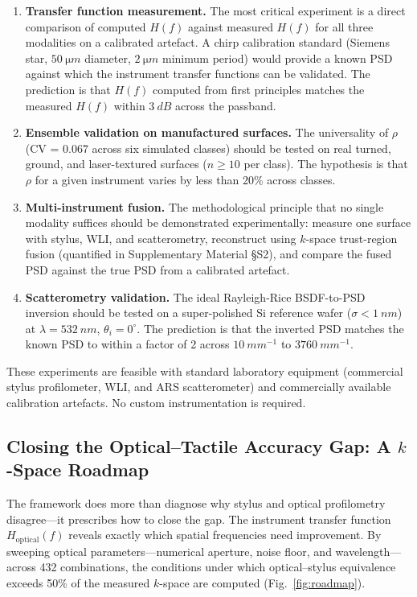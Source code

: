 \documentclass[review,12pt]{elsarticle}
\begin{document}
\begin{enumerate}
    \item \textbf{Transfer function measurement.} The most critical experiment is a direct comparison of computed $H(f)$ against measured $H(f)$ for all three modalities on a calibrated artefact. A chirp calibration standard (Siemens star, $\SI{50}{\micro m}$ diameter, $\SI{2}{\micro m}$ minimum period) would provide a known PSD against which the instrument transfer functions can be validated. The prediction is that $ H(f)$ computed from first principles matches the measured $ H(f)$ within $\SI{3}{dB}$ across the passband.
    
    \item \textbf{Ensemble validation on manufactured surfaces.} The universality of $\rho$ (CV = 0.067 across six simulated classes) should be tested on real turned, ground, and laser-textured surfaces ($n \geq 10$ per class). The hypothesis is that $\rho$ for a given instrument varies by less than 20\% across classes.
    
    \item \textbf{Multi-instrument fusion.} The methodological principle that no single modality suffices should be demonstrated experimentally: measure one surface with stylus, WLI, and scatterometry, reconstruct using $ k$-space trust-region fusion (quantified in Supplementary Material \S S2), and compare the fused PSD against the true PSD from a calibrated artefact.
    
    \item \textbf{Scatterometry validation.} The ideal Rayleigh-Rice BSDF-to-PSD inversion should be tested on a super-polished Si reference wafer ($\sigma < \SI{1}{nm}$) at $\lambda = \SI{532}{nm}$, $\theta_i = 0^\circ$. The prediction is that the inverted PSD matches the known PSD to within a factor of 2 across $\SI{10}{mm^{-1}}$ to $\SI{3760}{mm^{-1}}$.
\end{enumerate}

These experiments are feasible with standard laboratory equipment (commercial stylus profilometer, WLI, and ARS scatterometer) and commercially available calibration artefacts. No custom instrumentation is required.

\subsection{Closing the Optical--Tactile Accuracy Gap: A $k$-Space Roadmap}

The framework does more than diagnose why stylus and optical profilometry disagree---it prescribes how to close the gap. The instrument transfer function $H_\mathrm{optical}(f)$ reveals exactly which spatial frequencies need improvement. By sweeping optical parameters---numerical aperture, noise floor, and wavelength---across 432 combinations, the conditions under which optical--stylus equivalence exceeds 50\% of the measured $k$-space are computed (Fig.~\ref{fig:roadmap}).
\end{document}
